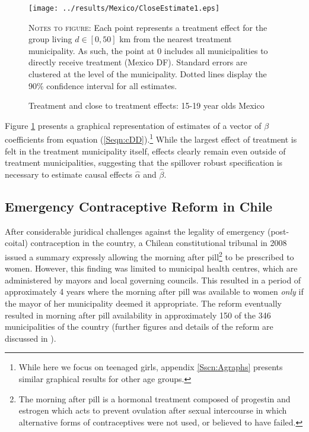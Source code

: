 \documentclass{article}
\begin{document}
\begin{spacing}{1.1}
\begin{figure}[htpb!]
\texttt{[image: ../results/Mexico/CloseEstimate1.eps]}
\caption{Treatment and close to treatment effects: 15-19 year olds Mexico}
\label{SFig:MexClose}
\vspace{2mm}
\begin{footnotesize}
\textsc{Notes to figure}: Each point represents a treatment effect for the group
living $d\in [0,50]$ km from the nearest treatment municipality.  As such, the
point at 0 includes all municipalities to directly receive treatment (Mexico DF).
Standard errors are clustered at the level of the municipality.  Dotted lines 
display the 90\% confidence interval for all estimates.
\end{footnotesize}
\end{figure}
Figure \ref{SFig:MexClose} presents a graphical representation of estimates
of a vector of $\beta$ coefficients from equation (\ref{Seqn:cDD}).\footnote{
While here we focus on teenaged girls, appendix \ref{Sscn:Agraphs} presents
similar graphical results for other age groups.}  While the largest effect of 
treatment is felt in the treatment municipality itself, effects clearly remain 
even outside of treatment municipalities, suggesting that the spillover robust 
specification is necessary to estimate causal effects $\hat\alpha$ and 
$\hat\beta$.

\subsection{Emergency Contraceptive Reform in Chile}
After considerable juridical challenges against the legality of emergency 
(post-coital) contraception in the country, a Chilean constitutional tribunal in 
2008 issued a summary expressly allowing the morning after pill\footnote{The morning
  after pill is a hormonal treatment composed of progestin and estrogen which acts
to prevent ovulation after sexual intercourse in which alternative forms of 
contraceptives were not used, or believed to have failed.} to be prescribed
to women.  However, this finding was limited to municipal health centres, which
are administered by mayors and local governing councils.  This resulted in a 
period of approximately 4 years where the morning after pill was available to
women \emph{only} if the mayor of her municipality deemed it appropriate.  The
reform eventually resulted in morning after pill availability in approximately
150 of the 346 municipalities of the country (further figures and details of the
reform are discussed in \citet{Clarke2014}).


\end{spacing}
\end{document}
